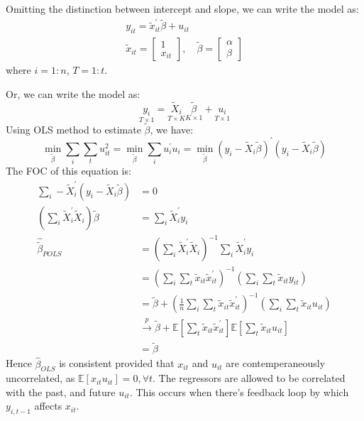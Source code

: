Omitting the distinction between intercept and slope, we can write the model as:
\begin{gather*}
  y_{it} = \tilde{x}_{it}^{\prime} \tilde{\beta} + u_{it} \\
  \tilde{x}_{it} = \begin{bmatrix}
    1 \\
    x_{it}
  \end{bmatrix}, \quad
  \tilde{\beta} = \begin{bmatrix}
    \alpha \\
    \beta
  \end{bmatrix}
\end{gather*}
where $i=1:n$, $T=1:t$.

Or, we can write the model as: 
\[ 
\underset{T\times 1}{y_i} = \underset{T \times K}{\tilde{X}_i} \underset{K \times 1}{\tilde{\beta}} + \underset{T \times 1}{u_i}
\]
Using OLS method to estimate $\tilde{\beta}$, we have:
\[
\underset{\tilde{\beta}}{\min} \sum_i \sum_t u_{it}^2 = \underset{\tilde{\beta}}{\min} \sum_i u_i^{\prime} u_i = \underset{\tilde{\beta}}{\min} (y_i - \tilde{X}_i \tilde{\beta})^{\prime} (y_i - \tilde{X}_i \tilde{\beta})
\]
The FOC of this equation is:
\begin{align*}
  \sum_i -\tilde{X}_i^{\prime} (y_i - \tilde{X}_i \tilde{\beta}) &= 0 \\
  \left(\sum_i \tilde{X}_i^{\prime} \tilde{X}_i \right) \tilde{\beta} &= \sum_i \tilde{X}_i^{\prime} y_i \\
  \hat{\tilde{\beta}}_{POLS} &= \left(\sum_i \tilde{X}_i^{\prime} \tilde{X}_i \right)^{-1} \sum_i \tilde{X}_i^{\prime} y_i \\
  &= \left(\sum_i \sum_t \tilde{x}_{it} \tilde{x}_{it}^{\prime} \right)^{-1} \left( \sum_i \sum_t \tilde{x}_{it} y_{it} \right) \\
  &= \tilde{\beta} + \left(\frac{1}{n} \sum_i \sum_t \tilde{x}_{it} \tilde{x}_{it}^{\prime} \right)^{-1} \left( \sum_i \sum_t \tilde{x}_{it} u_{it} \right) \\
  & \overset{p}{\rightarrow} \tilde{\beta} + \mathbb{E}\left[\sum_t \tilde{x}_{it} \tilde{x}_{it}^{\prime} \right] \mathbb{E}\left[\sum_t \tilde{x}_{it} u_{it} \right] \\
  &= \tilde{\beta}
\end{align*}
Hence $\hat{\beta}_{OLS}$ is consistent provided that $x_{it}$ and $u_{it}$ are contemperaneously uncorrelated,
as $\mathbb{E}[x_{it} u_{it}] = 0, \forall t.$
The regressors are allowed to be correlated with the past, and future $u_{it}$.
This occurs when there's feedback loop by which $y_{i,t-1}$ affects $x_{it}$.

